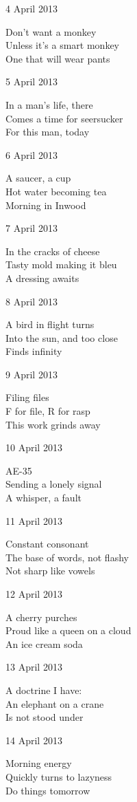 \documentclass[12pt]{article}
\begin{document}
4 April 2013

Don't want a monkey \\
Unless it's a smart monkey \\
One that will wear pants

5 April 2013

In a man's life, there  \\
Comes a time for seersucker \\
For this man, today

6 April 2013

A saucer, a cup \\
Hot water becoming tea \\
Morning in Inwood

7 April 2013

In the cracks of cheese \\
Tasty mold making it bleu \\
A dressing awaits

8 April 2013

A bird in flight turns \\
Into the sun, and too close \\
Finds infinity

9 April 2013

Filing files \\
F for file, R for rasp \\
This work grinds away

\newpage

10 April 2013

AE-35 \\
Sending a lonely signal \\
A whisper, a fault

11 April 2013

Constant consonant \\
The base of words, not flashy \\
Not sharp like vowels

12 April 2013

A cherry purches \\
Proud like a queen on a cloud \\
An ice cream soda

13 April 2013

A doctrine I have: \\
An elephant on a crane \\
Is not stood under

14 April 2013

Morning energy \\
Quickly turns to lazyness \\
Do things tomorrow
\end{document}
